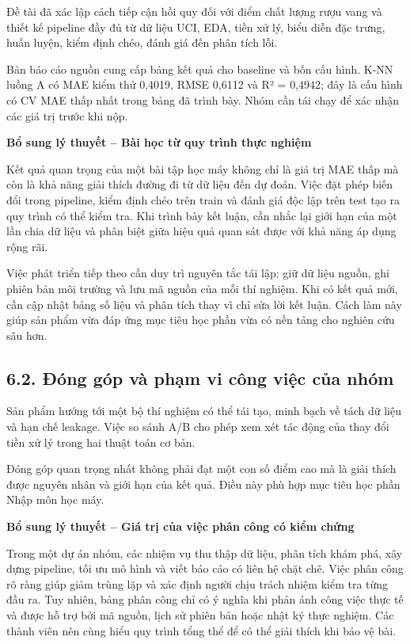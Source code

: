 \documentclass[12pt,a4paper,oneside]{article}
\begin{document}
Đề tài đã xác lập cách tiếp cận hồi quy đối với điểm chất lượng rượu
vang và thiết kế pipeline đầy đủ từ dữ liệu UCI, EDA, tiền xử lý, biểu
diễn đặc trưng, huấn luyện, kiểm định chéo, đánh giá đến phân tích lỗi.

Bản báo cáo nguồn cung cấp bảng kết quả cho baseline và bốn cấu hình.
K-NN luồng A có MAE kiểm thử 0,4019, RMSE 0,6112 và R² = 0,4942; đây là
cấu hình có CV MAE thấp nhất trong bảng đã trình bày. Nhóm cần tái chạy
để xác nhận các giá trị trước khi nộp.


\par\noindent\textbf{Bổ sung lý thuyết -- Bài học từ quy trình thực nghiệm}\par
Kết quả quan trọng của một bài tập học máy không chỉ là giá trị MAE thấp mà còn là khả năng giải thích đường đi từ dữ liệu đến dự đoán. Việc đặt phép biến đổi trong pipeline, kiểm định chéo trên train và đánh giá độc lập trên test tạo ra quy trình có thể kiểm tra. Khi trình bày kết luận, cần nhắc lại giới hạn của một lần chia dữ liệu và phân biệt giữa hiệu quả quan sát được với khả năng áp dụng rộng rãi.\par

Việc phát triển tiếp theo cần duy trì nguyên tắc tái lập: giữ dữ liệu nguồn, ghi phiên bản môi trường và lưu mã nguồn của mỗi thí nghiệm. Khi có kết quả mới, cần cập nhật bảng số liệu và phân tích thay vì chỉ sửa lời kết luận. Cách làm này giúp sản phẩm vừa đáp ứng mục tiêu học phần vừa có nền tảng cho nghiên cứu sâu hơn.\par

\subsection*{6.2. Đóng góp và phạm vi công việc của nhóm}

Sản phẩm hướng tới một bộ thí nghiệm có thể tái tạo, minh bạch về tách
dữ liệu và hạn chế leakage. Việc so sánh A/B cho phép xem xét tác động
của thay đổi tiền xử lý trong hai thuật toán cơ bản.

Đóng góp quan trọng nhất không phải đạt một con số điểm cao mà là giải
thích được nguyên nhân và giới hạn của kết quả. Điều này phù hợp mục
tiêu học phần Nhập môn học máy.


\par\noindent\textbf{Bổ sung lý thuyết -- Giá trị của việc phân công có kiểm chứng}\par
Trong một dự án nhóm, các nhiệm vụ thu thập dữ liệu, phân tích khám phá, xây dựng pipeline, tối ưu mô hình và viết báo cáo có liên hệ chặt chẽ. Việc phân công rõ ràng giúp giảm trùng lặp và xác định người chịu trách nhiệm kiểm tra từng đầu ra. Tuy nhiên, bảng phân công chỉ có ý nghĩa khi phản ánh công việc thực tế và được hỗ trợ bởi mã nguồn, lịch sử phiên bản hoặc nhật ký thực nghiệm. Các thành viên nên cùng hiểu quy trình tổng thể để có thể giải thích khi bảo vệ bài.\par
\end{document}
